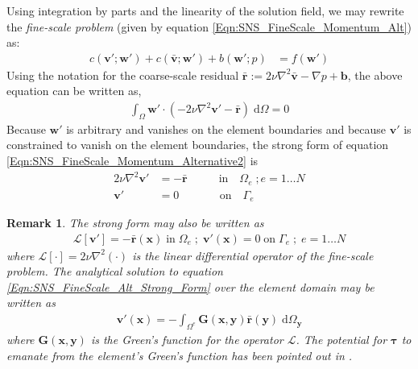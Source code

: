 \documentclass[11pt]{amsart}
\newtheorem{remark}[theorem]{Remark}
\begin{document}
Using integration by parts and the linearity of the solution field, we may rewrite the \emph{fine-scale problem} (given by equation \eqref{Eqn:SNS_FineScale_Momentum_Alt}) as:
\begin{align}
  \label{Eqn:SNS_FineScale_Momentum_Alternative1}
c(\boldsymbol{v}';\boldsymbol{w}') +
  c(\bar{\boldsymbol{v}};\boldsymbol{w}') +
  b(\boldsymbol{w}';p) &=
  f(\boldsymbol{w}')
\end{align}
Using the notation for the coarse-scale residual $\bar{\boldsymbol{r}} := 2\nu \nabla^2 \bar{\boldsymbol{v}} - \nabla p + \boldsymbol{b}$, the above equation can be written as,
\begin{align}
  \label{Eqn:SNS_FineScale_Momentum_Alternative2}
\int_{\Omega} \boldsymbol{w}' \cdot (- 2\nu \nabla^2 \boldsymbol{v}' -  \bar{\boldsymbol{r}})\; \mathrm{d} \Omega = 0
 \end{align}
Because $\boldsymbol{w}'$ is arbitrary and vanishes on the element boundaries and because $\boldsymbol{v}'$ is constrained to vanish on the element boundaries, the strong form of equation \eqref{Eqn:SNS_FineScale_Momentum_Alternative2} is
\begin{align}
  \label{Eqn:SNS_FineScale_Momentum_Alt3}
2\nu \nabla^2 \boldsymbol{v}' &= -  \bar{\boldsymbol{r}} \qquad \; \;  \ \mbox{in}  \quad \Omega_e \; ; e = 1 \ldots N\\
    \boldsymbol{v}' &= 0 \qquad \; \; \; \; \;  \ \mbox{on}  \quad \Gamma_e
 \end{align}
\begin{remark}
The strong form may also be written as 
\begin{align}
  \label{Eqn:SNS_FineScale_Alt_Strong_Form}
\mathcal{L} \left[ \boldsymbol{v}' \right] = -  \bar{\boldsymbol{r}}(\boldsymbol{x}) \;   \mbox{in} \; \Omega_e \; ; \;  \boldsymbol{v}'(\boldsymbol{x}) = 0 \; \mbox{on} \; \Gamma_e \; ; \; e = 1 \ldots N
\end{align}
where $\mathcal{L} \left[ \cdot \right] = 2\nu \nabla^2(\cdot)$ is the linear differential operator of the \emph{fine-scale problem}.  The analytical solution to equation \eqref{Eqn:SNS_FineScale_Alt_Strong_Form} over the element domain may be written as
 \begin{align}
  \label{Eqn:SNS_Greens_Analytical}
\boldsymbol{v}'(\boldsymbol{x}) = - \int_{\Omega^e} \boldsymbol{G}(\boldsymbol{x}, \boldsymbol{y})\bar{\boldsymbol{r}}(\boldsymbol{y})  \; \mathrm{d} \Omega_{\boldsymbol{y}}
 \end{align}
 where $\boldsymbol{G}(\boldsymbol{x}, \boldsymbol{y})$ is the Green's function for the operator $\mathcal{L}$.  The potential for $\boldsymbol{\tau}$ to emanate from the element's Green's function has been pointed out in \cite{Hughes2}.
\end{remark}
\end{document}
